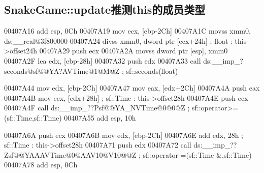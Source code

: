 \documentclass[AutoFakeBold,AutoFakeSlant]{beamer}
\begin{document}
	\subsection{SnakeGame::update推测this的成员类型}
	\begin{frame}[fragile]
		\tiny
		\linespread{1.2} \selectfont
\begin{x86asmcode}
00407A16  add     esp, 0Ch
00407A19  mov     ecx, [ebp-2Ch]
00407A1C  movss   xmm0, ds:__real@3f800000
00407A24  divss   xmm0, dword ptr [ecx+24h] ; float : this->offset24h
00407A29  push    ecx
00407A2A  movss   dword ptr [esp], xmm0
00407A2F  lea     edx, [ebp-28h]
00407A32  push    edx
00407A33  call    ds:__imp_?seconds@sf@@YA?AVTime@1@M@Z ; sf::seconds(float)

00407A44  mov     edx, [ebp-2Ch]
00407A47  mov     eax, [edx+2Ch] 
00407A4A  push    eax
00407A4B  mov     ecx, [edx+28h] ; sf::Time : this->offset28h
00407A4E  push    ecx
00407A4F  call    ds:__imp_??Psf@@YA_NVTime@0@0@Z ; sf::operator>=(sf::Time,sf::Time)
00407A55  add     esp, 10h

00407A6A  push    ecx
00407A6B  mov     edx, [ebp-2Ch]
00407A6E  add     edx, 28h ; sf::Time : this->offset28h
00407A71  push    edx
00407A72  call    ds:__imp_??Zsf@@YAAAVTime@0@AAV10@V10@@Z ; sf::operator-=(sf::Time &,sf::Time)
00407A78  add     esp, 0Ch\end{x86asmcode}
	\end{frame}
	
\end{document}
